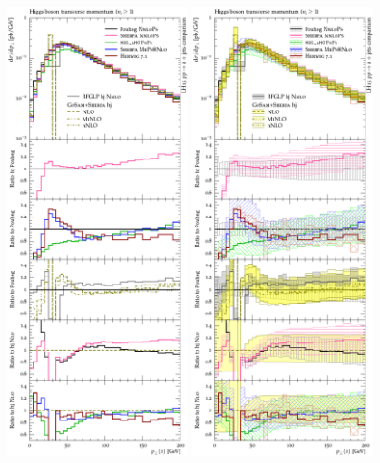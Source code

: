 \begin{figure}[t!]
  \centering
  \includegraphics[width=0.47\textwidth]{figures/hjetscomp_u_H_j_pT_incl.pdf}
  \hfill
  \includegraphics[width=0.47\textwidth]{figures/hjetscomp_H_j_pT_incl.pdf}

\end{figure}
